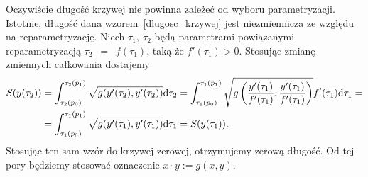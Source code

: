 Oczywiście 
długość krzywej nie powinna zależeć od wyboru parametryzacji.
Istotnie, długość dana wzorem~\eqref{dlugosc_krzywej}
jest niezmiennicza ze względu na reparametryzację.
Niech $\tau_1,\ \tau_2$ będą parametrami powiązanymi 
reparametryzacją  $\tau_2$~$=$~$f(\tau_1)$, taką że 
$f'(\tau_1) > 0$. %
Stosując zmianę zmiennych całkowania dostajemy
\begin{align*}
S(y(\tau_2)) &= 
\int_{\tau_2(p_0)}^{\tau_2(p_1)} \sqrt{g (
y' (\tau_2), y' (\tau_2) )} \text{d} \tau_2  = 
\int_{\tau_1(p_0)}^{\tau_1(p_1)} \sqrt{g \left(
\frac{ y' (\tau_1) }{ f'(\tau_1)}, 
\frac{ y' (\tau_1) }{ f'(\tau_1)} \right)} 
f'(\tau_1) \text{d} \tau_1 = \\
& = 
\int_{\tau_1(p_0)}^{\tau_1(p_1)} \sqrt{g (
y' (\tau_1), y' (\tau_1)  )} \text{d} \tau_1  
=S(y(\tau_1)).
\end{align*}
Stosując ten sam wzór do krzywej zerowej, otrzymujemy zerową
długość. Od tej pory będziemy stosować
oznaczenie $ x\cdot y := g(x,y)$.

